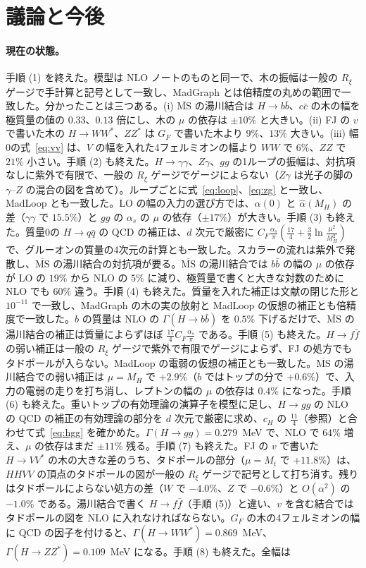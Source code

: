 \documentclass[a4paper,10pt]{ltjsarticle}
\newcommand{\MSbar}{\overline{\mathrm{MS}}}
\begin{document}
\section{議論と今後}\label{sec:discussion}

\paragraph{現在の状態。}手順 (1) を終えた。模型は NLO ノートのものと同一で、木の振幅は一般の $R_\xi$ ゲージで手計算と記号として一致し、MadGraph とは倍精度の丸めの範囲で一致した。分かったことは三つある。(i) $\MSbar$ の湯川結合は $H\to b\bar b$、$c\bar c$ の木の幅を極質量の値の $0.33$、$0.13$ 倍にし、木の $\mu$ の依存は $\pm10\%$ と大きい。(ii) FJ の $v$ で書いた木の $H\to WW^*$、$ZZ^*$ は $G_F$ で書いた木より $9\%$、$13\%$ 大きい。(iii) 幅0の式~\eqref{eq:vv} は、$V$ の幅を入れた4フェルミオンの幅より $WW$ で $6\%$、$ZZ$ で $21\%$ 小さい。手順 (2) も終えた。$H\to\gamma\gamma$、$Z\gamma$、$gg$ の1ループの振幅は、対抗項なしに紫外で有限で、一般の $R_\xi$ ゲージでゲージによらない（$Z\gamma$ は光子の脚の $\gamma$--$Z$ の混合の図を含めて）。ループごとに式~\eqref{eq:loop}、\eqref{eq:zg} と一致し、MadLoop とも一致した。LO の幅の入力の選び方では、$\alpha(0)$ と $\hat\alpha(M_H)$ の差（$\gamma\gamma$ で $15.5\%$）と $gg$ の $\alpha_s$ の $\mu$ の依存（$\pm17\%$）が大きい。手順 (3) も終えた。質量0の $H\to q\bar q$ の QCD の補正は、$d$ 次元で厳密に $C_F\frac{\alpha_s}\pi(\frac{17}4+\frac32\ln\frac{\mu^2}{M_H^2})$ で、グルーオンの質量の4次元の計算とも一致した。スカラーの流れは紫外で発散し、$\MSbar$ の湯川結合の対抗項が要る。$\MSbar$ の湯川結合では $b\bar b$ の幅の $\mu$ の依存が LO の $19\%$ から NLO の $5\%$ に減り、極質量で書くと大きな対数のために NLO でも $60\%$ 違う。手順 (4) も終えた。質量を入れた補正は文献の閉じた形と $10^{-11}$ で一致し、MadGraph の木の実の放射と MadLoop の仮想の補正とも倍精度で一致した。$b$ の質量は NLO の $\Gamma(H\to b\bar b)$ を $0.5\%$ 下げるだけで、$\MSbar$ の湯川結合の補正は質量によらずほぼ $\frac{17}4C_F\frac{\alpha_s}\pi$ である。手順 (5) も終えた。$H\to f\bar f$ の弱い補正は一般の $R_\xi$ ゲージで紫外で有限でゲージによらず、FJ の処方でもタドポールが入らない。MadLoop の電弱の仮想の補正とも一致した。$\MSbar$ の湯川結合での弱い補正は $\mu=M_H$ で $+2.9\%$（$b$ ではトップの分で $+0.6\%$）で、入力の電弱の走りを打ち消し、レプトンの幅の $\mu$ の依存は $0.4\%$ になった。手順 (6) も終えた。重いトップの有効理論の演算子を模型に足し、$H\to gg$ の NLO の QCD の補正の有効理論の部分を $d$ 次元で厳密に求め、$c_H$ の $\frac{11}4$（参照）と合わせて式~\eqref{eq:hgg} を確かめた。$\Gamma(H\to gg)=0.279$~MeV で、NLO で $64\%$ 増え、$\mu$ の依存はまだ $\pm11\%$ 残る。手順 (7) も終えた。FJ の $v$ で書いた $H\to VV^*$ の木の大きな差のうち、タドポールの部分（$\mu=M_t$ で $+11.8\%$）は、$HHVV$ の頂点のタドポールの図が一般の $R_\xi$ ゲージで記号として打ち消す。残りはタドポールによらない処方の差（$W$ で $-4.0\%$、$Z$ で $-0.6\%$）と $O(\alpha^2)$ の $-1.0\%$ である。湯川結合で書く $H\to f\bar f$（手順 (5)）と違い、$v$ を含む結合ではタドポールの図を NLO に入れなければならない。$G_F$ の木の4フェルミオンの幅に QCD の因子を付けると、$\Gamma(H\to WW^*)=0.869$~MeV、$\Gamma(H\to ZZ^*)=0.109$~MeV になる。手順 (8) も終えた。全幅は 
\end{document}

